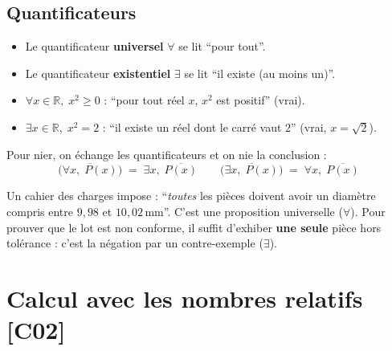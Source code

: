 \documentclass[a4paper,11pt]{article}
\begin{document}
\subsection{Quantificateurs}

\begin{definition}
\begin{itemize}
  \item Le quantificateur \textbf{universel} $\forall$ se lit ``pour tout''.
  \item Le quantificateur \textbf{existentiel} $\exists$ se lit ``il existe (au moins un)''.
\end{itemize}
\end{definition}

\begin{exemple}[-- Lecture]
\begin{itemize}
  \item $\forall x \in \mathbb{R},\; x^2 \geq 0$ : ``pour tout réel $x$, $x^2$ est positif'' (vrai).
  \item $\exists x \in \mathbb{R},\; x^2 = 2$ : ``il existe un réel dont le carré vaut $2$'' (vrai, $x = \sqrt{2}$).
\end{itemize}
\end{exemple}

\begin{methode}
Pour nier, on échange les quantificateurs et on nie la conclusion :
\[
\overline{\big(\forall x,\; P(x)\big)} \;=\; \exists x,\; \overline{P(x)}
\qquad
\overline{\big(\exists x,\; P(x)\big)} \;=\; \forall x,\; \overline{P(x)}
\]
\end{methode}

\begin{appliindus}
Un cahier des charges impose : ``\emph{toutes} les pièces doivent avoir un diamètre compris entre $9{,}98$ et $10{,}02$\,mm''. C'est une proposition universelle ($\forall$). Pour prouver que le lot est non conforme, il suffit d'exhiber \textbf{une seule} pièce hors tolérance : c'est la négation par un contre-exemple ($\exists$).
\end{appliindus}

\newpage
\section{Calcul avec les nombres relatifs \hfill {\normalsize\color{uimmred}[C02]}}
\end{document}
